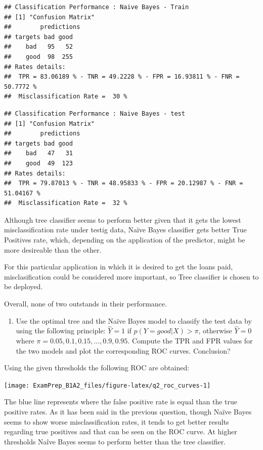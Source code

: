 \documentclass[
]{article}
\providecommand{\tightlist}{%
  \setlength{\itemsep}{0pt}\setlength{\parskip}{0pt}}
\begin{document}
\begin{verbatim}
## Classification Performance : Naive Bayes - Train 
## [1] "Confusion Matrix"
##        predictions
## targets bad good
##    bad   95   52
##    good  98  255
## Rates details:
##  TPR = 83.06189 % - TNR = 49.2228 % - FPR = 16.93811 % - FNR = 50.7772 %
##  Misclassification Rate =  30 %
\end{verbatim}

\begin{verbatim}
## Classification Performance : Naive Bayes - test 
## [1] "Confusion Matrix"
##        predictions
## targets bad good
##    bad   47   31
##    good  49  123
## Rates details:
##  TPR = 79.87013 % - TNR = 48.95833 % - FPR = 20.12987 % - FNR = 51.04167 %
##  Misclassification Rate =  32 %
\end{verbatim}

Although tree classifier seems to perform better given that it gets the
lowest misclassification rate under testig data, Naïve Bayes classifier
gets better True Positives rate, which, depending on the application of
the predictor, might be more desireable than the other.

For this particular application in which it is desired to get the loans
paid, misclasification could be considered more important, so Tree
classifier is chosen to be deployed.

Overall, none of two outstands in their performance.

\begin{enumerate}
\def\labelenumi{\arabic{enumi}.}
\setcounter{enumi}{4}
\tightlist
\item
  Use the optimal tree and the Naïve Bayes model to classify the test
  data by using the following principle: \(\hat{Y} = 1\) if
  \(p(Y=good|X) > \pi\), otherwise \(\hat{Y}=0\) where
  \(\pi = 0.05, 0.1, 0.15, ..., 0.9, 0.95\). Compute the TPR and FPR
  values for the two models and plot the corresponding ROC curves.
  Conclusion?
\end{enumerate}

Using the given thresholds the following ROC are obtained:

\begin{center}\texttt{[image: ExamPrep\_B1A2\_files/figure-latex/q2\_roc\_curves-1]} \end{center}

The blue line represents where the false positive rate is equal than the
true positive rates. As it has been said in the previous question,
though Naïve Bayes seems to show worse misclassification rates, it tends
to get better results regarding true positives and that can be seen on
the ROC curve. At higher thresholds Naîve Bayes seems to perform better
than the tree classifier.
\end{document}
